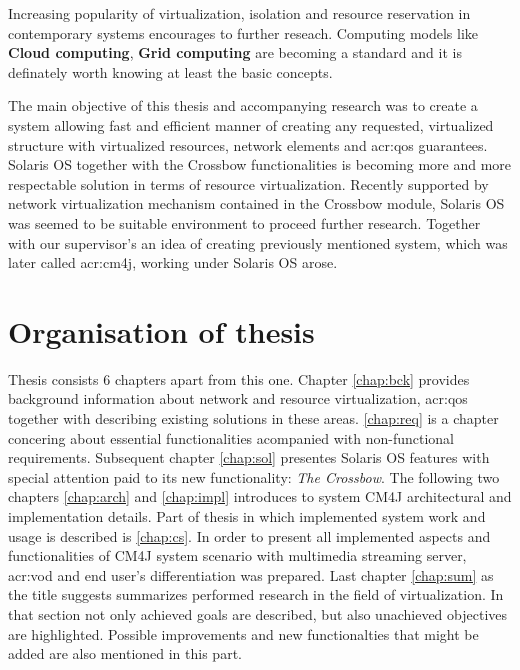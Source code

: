 \documentclass[11pt]{book}
\begin{document}
	
	Increasing popularity of virtualization, isolation and resource reservation in contemporary systems encourages to 
	further reseach. Computing models like \textbf{Cloud computing}, \textbf{Grid computing} are becoming a standard and it 
	is definately worth knowing at least the basic concepts.

	\medskip
	
  The main objective of this thesis and accompanying research was to create a system allowing fast and efficient manner
  of creating any requested, virtualized structure with virtualized resources, network elements and \gls{acr:qos}
  guarantees.  Solaris OS together with the Crossbow functionalities is becoming more and more respectable solution in
  terms of resource virtualization.  Recently supported by network virtualization mechanism contained in the Crossbow
  module, Solaris OS was seemed to be suitable environment to proceed further research.  Together with our supervisor's
  an idea of creating previously mentioned system, which was later called \gls{acr:cm4j}, working under Solaris OS
  arose. 

	\section{Organisation of thesis}

	Thesis consists 6 chapters apart from this one. Chapter \ref{chap:bck} provides background information about network and resource
	 virtualization,  \gls{acr:qos} together with describing existing solutions in these areas. \ref{chap:req} is a chapter concering
	 about essential functionalities acompanied with non-functional requirements. Subsequent chapter \ref{chap:sol} presentes
	 Solaris OS features with special attention paid to its new functionality: \textit{The Crossbow}. The following
	 two chapters \ref{chap:arch} and \ref{chap:impl} introduces to system CM4J architectural and implementation details. %
	Part of thesis in which implemented system work and usage is described is \ref{chap:cs}. In order to present all implemented aspects
	and functionalities of CM4J system scenario with multimedia streaming server, \gls{acr:vod} and end user's differentiation was prepared. 
	Last chapter \ref{chap:sum} as the title suggests summarizes performed research in the field of virtualization. In that section
	not only achieved goals are described, but also unachieved objectives are highlighted. Possible improvements and new 
	functionalties that might be added are also mentioned in this part. 
\end{document}
